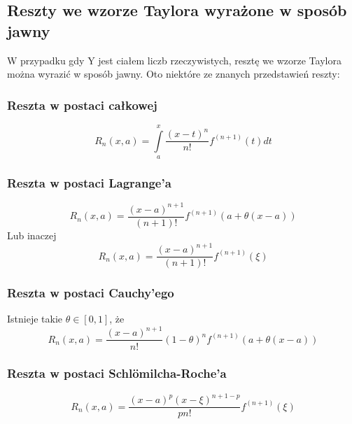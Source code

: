 \documentclass{article}
\begin{document}
\subsection*{Reszty we wzorze Taylora wyrażone w sposób jawny}
W przypadku gdy Y jest ciałem liczb rzeczywistych, resztę we wzorze Taylora można wyrazić w sposób jawny. Oto niektóre ze znanych przedstawień reszty: 

\subsubsection*{Reszta w postaci całkowej}
\[ R_{n}(x,a)=\int \limits _{a}^{x}{\frac {(x-t)^{n}}{n!}}f^{(n+1)}(t)dt \]

\subsubsection*{Reszta w postaci Lagrange'a}
\[ R_{n}(x,a)={\frac {(x-a)^{n+1}}{(n+1)!}}f^{(n+1)}(a+\theta (x-a)) \]
Lub inaczej
\[ R_{n}(x,a)={\frac {(x-a)^{n+1}}{(n+1)!}}f^{(n+1)}(\xi ) \]

\subsubsection*{Reszta w postaci Cauchy'ego}
Istnieje takie $ \theta \in [0,1] $, że
$$ R_{n}(x,a)={\frac {(x-a)^{n+1}}{n!}}(1-\theta )^{n}f^{(n+1)}(a+\theta (x-a)) $$

\subsubsection*{Reszta w postaci Schlömilcha-Roche’a}
\begin{displaymath}
R_{n}(x,a)={\frac {(x-a)^{p}(x-\xi )^{n+1-p}}{pn!}}f^{(n+1)}(\xi )
\end{displaymath}
\end{document}
